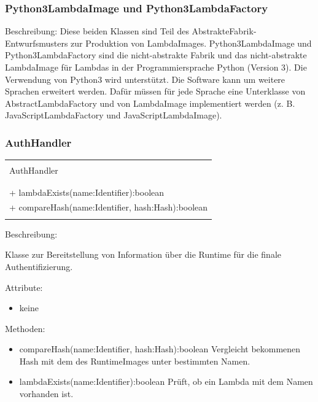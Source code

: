 \documentclass[a4paper,20pt,oneside]{book}
\begin{document}
		
	\subsubsection{Python3LambdaImage und Python3LambdaFactory}
	Beschreibung: 
	\linebreak Diese beiden Klassen sind Teil des AbstrakteFabrik-Entwurfsmusters zur Produktion von LambdaImages. Python3LambdaImage und Python3LambdaFactory sind die nicht-abstrakte Fabrik und das nicht-abstrakte LambdaImage für Lambdas in der Programmiersprache Python (Version 3).
	\linebreak
	Die Verwendung von Python3 wird unterstützt. Die Software kann um weitere Sprachen erweitert werden. Dafür müssen für jede Sprache eine Unterklasse von AbstractLambdaFactory und von LambdaImage implementiert werden (z. B. JavaScriptLambdaFactory und JavaScriptLambdaImage).
	
	\subsubsection{AuthHandler}
	\centering
	\begin{tabular}{|l|}
	\hline \\
	AuthHandler \\
	\hline \\

	\hline \\
	+ lambdaExists(name:Identifier):boolean \\
	+ compareHash(name:Identifier, hash:Hash):boolean\\
	\\ \hline
	\end{tabular}
	
	\raggedright
	\vspace{0.5cm}
	Beschreibung:
	
	Klasse zur Bereitstellung von Information über die Runtime für die finale Authentifizierung.
	
	\vspace{0.5cm}
	Attribute:
	\begin{itemize}
	\item keine
	\end{itemize}
	
	Methoden:
	\begin{itemize}
	\item compareHash(name:Identifier, hash:Hash):boolean\linebreak
	Vergleicht bekommenen Hash mit dem des RuntimeImages unter bestimmten Namen.
	\item lambdaExists(name:Identifier):boolean \linebreak
	Prüft, ob ein Lambda mit dem Namen vorhanden ist.
	\end{itemize}
	
\end{document}
